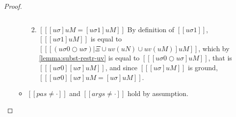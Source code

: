 \begin{proof}
\begin{caseof}
\begin{enumerate}
\begin{itemize}
\begin{enumerate}
$$                                    $$
                                \item $[[ [uσ]uM = [uσ1]uM]]$
                                        By definition of $[[uσ1]]$,
                                        $[[ [uσ1]uM ]]$ is equal to\\
                                        $[[ [(uσ0 ○ uσ)|Ξ ∪ uv(uN) ∪ uv(uM)]uM ]]$,
                                        which by \cref{lemma:subst-restr-uv} is equal to
                                        $[[ [uσ0 ○ uσ]uM ]]$,
                                        that is $[[ [uσ0][uσ]uM ]]$,
                                        and since $[[ [uσ]uM ]]$ is ground, 
                                        $[[ [uσ0][uσ]uM = [uσ]uM ]]$.
                            \end{enumerate}
                        \item $[[pas ≠ ·]]$ and $[[args ≠ ·]]$ hold by assumption.
                    \end{itemize}
            \end{enumerate}
    \end{caseof}
\end{proof}

